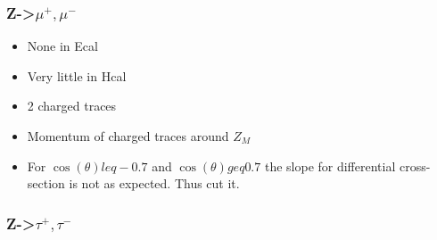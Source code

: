 \documentclass[]{article}
\begin{document}
\subsubsection{Z->$\mu^+, \mu^-$}
\begin{itemize}  
\item None in Ecal
\item Very little in Hcal
\item 2 charged traces
\item Momentum of charged traces around $Z_M$
\item For $\cos(\theta) leq -0.7$ and $\cos(\theta) geq 0.7$ the slope for differential cross-section is not as expected. Thus cut it.
\end{itemize}

\subsubsection{Z->$\tau^+, \tau^-$}
\end{document}
